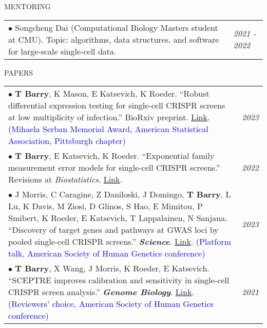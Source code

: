 \documentclass{resume} %
\begin{document}


\begin{rSection}{MENTORING}
	\begin{tabular}{p{14cm}R{2.5cm}}
		$\bullet$ Songcheng Dai (Computational Biology Masters student at CMU). Topic: algorithms, data structures, and software for large-scale single-cell data.
		& \textit{2021 - 2022} \\ 
	\end{tabular} 
\end{rSection}
 
\begin{rSection}{PAPERS}

\begin{tabular}{p{14cm}R{2.5cm}}
	$\bullet$ \textbf{T Barry}, K Mason, E Katsevich, K Roeder. ``Robust differential expression testing for single-cell CRISPR screens at low multiplicity of infection.'' BioRxiv preprint. \href{https://www.biorxiv.org/content/10.1101/2023.05.15.540875v1}{Link}. \textcolor{blue}{(Mihaela Serban Memorial Award, American Statistical Association, Pittsburgh chapter)}  & \textit{2023} \\
	$\bullet$ \textbf{T Barry}, E Katsevich, K Roeder. ``Exponential family measurement error models for single-cell CRISPR screens.'' Revisions at \textit{Biostatistics}. \href{https://arxiv.org/abs/2201.01879}{Link}. & \textit{2022} \\
	 $\bullet$ J Morris, C Caragine, Z Daniloski, J Domingo, \textbf{T Barry}, L Lu, K Davis, M Ziosi, D Glinos, S Hao, E Mimitou, P Smibert, K Roeder, E Katsevich, T Lappalainen, N Sanjana. ``Discovery of target genes and pathways at GWAS loci by pooled single-cell CRISPR screens.'' \textit{\textbf{Science}}.  \href{https://www.science.org/doi/10.1126/science.adh7699}{Link}. \textcolor{blue}{(Platform talk, American Society of Human Genetics conference)}  & \textit{2023} \\
	$\bullet$ \textbf{T Barry}, X Wang, J Morris, K Roeder, E Katsevich. ``SCEPTRE improves calibration and sensitivity in single-cell CRISPR screen analysis.'' \textit{\textbf{Genome Biology}}. \href{https://genomebiology.biomedcentral.com/articles/10.1186/s13059-021-02545-2}{Link}. \textcolor{blue}{(Reviewers’ choice, American Society of Human Genetics conference)} 
	& \textit{2021}  
	\\
\end{tabular} 




\end{rSection}
\end{document}
